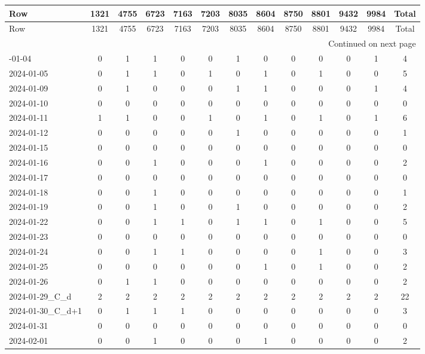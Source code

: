 \documentclass[dvipdfmx,oneside]{article}
\begin{document}
\begingroup
\footnotesize
\begin{longtable}{lcccccccccccc}
\toprule
Row & 1321 & 4755 & 6723 & 7163 & 7203 & 8035 & 8604 & 8750 & 8801 & 9432 & 9984 & Total \\
\midrule
\endfirsthead
\toprule
Row & 1321 & 4755 & 6723 & 7163 & 7203 & 8035 & 8604 & 8750 & 8801 & 9432 & 9984 & Total \\
\midrule
\endhead
\midrule
\multicolumn{13}{r}{Continued on next page} \\
\midrule
\endfoot
\bottomrule
\endlastfoot
2024-01-04 & 0 & 1 & 1 & 0 & 0 & 1 & 0 & 0 & 0 & 0 & 1 & 4 \\
2024-01-05 & 0 & 1 & 1 & 0 & 1 & 0 & 1 & 0 & 1 & 0 & 0 & 5 \\
2024-01-09 & 0 & 1 & 0 & 0 & 0 & 1 & 1 & 0 & 0 & 0 & 1 & 4 \\
2024-01-10 & 0 & 0 & 0 & 0 & 0 & 0 & 0 & 0 & 0 & 0 & 0 & 0 \\
2024-01-11 & 1 & 1 & 0 & 0 & 1 & 0 & 1 & 0 & 1 & 0 & 1 & 6 \\
2024-01-12 & 0 & 0 & 0 & 0 & 0 & 1 & 0 & 0 & 0 & 0 & 0 & 1 \\
2024-01-15 & 0 & 0 & 0 & 0 & 0 & 0 & 0 & 0 & 0 & 0 & 0 & 0 \\
2024-01-16 & 0 & 0 & 1 & 0 & 0 & 0 & 1 & 0 & 0 & 0 & 0 & 2 \\
2024-01-17 & 0 & 0 & 0 & 0 & 0 & 0 & 0 & 0 & 0 & 0 & 0 & 0 \\
2024-01-18 & 0 & 0 & 1 & 0 & 0 & 0 & 0 & 0 & 0 & 0 & 0 & 1 \\
2024-01-19 & 0 & 0 & 1 & 0 & 0 & 1 & 0 & 0 & 0 & 0 & 0 & 2 \\
2024-01-22 & 0 & 0 & 1 & 1 & 0 & 1 & 1 & 0 & 1 & 0 & 0 & 5 \\
2024-01-23 & 0 & 0 & 0 & 0 & 0 & 0 & 0 & 0 & 0 & 0 & 0 & 0 \\
2024-01-24 & 0 & 0 & 1 & 1 & 0 & 0 & 0 & 0 & 1 & 0 & 0 & 3 \\
2024-01-25 & 0 & 0 & 0 & 0 & 0 & 0 & 1 & 0 & 1 & 0 & 0 & 2 \\
2024-01-26 & 0 & 1 & 1 & 0 & 0 & 0 & 0 & 0 & 0 & 0 & 0 & 2 \\
2024-01-29\_C\_d & 2 & 2 & 2 & 2 & 2 & 2 & 2 & 2 & 2 & 2 & 2 & 22 \\
2024-01-30\_C\_d+1 & 0 & 1 & 1 & 1 & 0 & 0 & 0 & 0 & 0 & 0 & 0 & 3 \\
2024-01-31 & 0 & 0 & 0 & 0 & 0 & 0 & 0 & 0 & 0 & 0 & 0 & 0 \\
2024-02-01 & 0 & 0 & 1 & 0 & 0 & 0 & 1 & 0 & 0 & 0 & 0 & 2 \\

\end{longtable}
\end{document}

